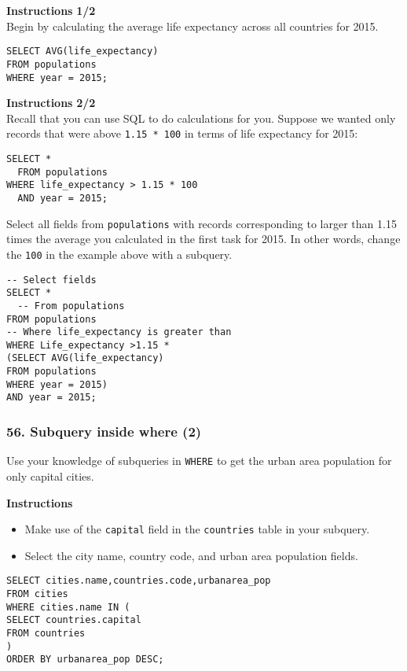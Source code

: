 \documentclass[
]{article}
\providecommand{\tightlist}{%
  \setlength{\itemsep}{0pt}\setlength{\parskip}{0pt}}
\begin{document}
\textbf{Instructions} \textbf{1/2}\\
Begin by calculating the average life expectancy across all countries
for 2015.

\begin{verbatim}
SELECT AVG(life_expectancy)
FROM populations
WHERE year = 2015;
\end{verbatim}

\textbf{Instructions} \textbf{2/2}\\
Recall that you can use SQL to do calculations for you. Suppose we
wanted only records that were above \texttt{1.15\ *\ 100} in terms of
life expectancy for 2015:

\begin{verbatim}
SELECT *
  FROM populations
WHERE life_expectancy > 1.15 * 100
  AND year = 2015;
\end{verbatim}

Select all fields from \texttt{populations} with records corresponding
to larger than 1.15 times the average you calculated in the first task
for 2015. In other words, change the \texttt{100} in the example above
with a subquery.

\begin{verbatim}
-- Select fields
SELECT *
  -- From populations
FROM populations
-- Where life_expectancy is greater than
WHERE Life_expectancy >1.15 * 
(SELECT AVG(life_expectancy)
FROM populations
WHERE year = 2015) 
AND year = 2015;
\end{verbatim}

\hypertarget{subquery-inside-where-2}{%
\subsubsection{56. Subquery inside where
(2)}\label{subquery-inside-where-2}}

Use your knowledge of subqueries in \texttt{WHERE} to get the urban area
population for only capital cities.

\textbf{Instructions}

\begin{itemize}
\tightlist
\item
  Make use of the \texttt{capital} field in the \texttt{countries} table
  in your subquery.\\
\item
  Select the city name, country code, and urban area population fields.
\end{itemize}

\begin{verbatim}
SELECT cities.name,countries.code,urbanarea_pop
FROM cities
WHERE cities.name IN (
SELECT countries.capital
FROM countries
)
ORDER BY urbanarea_pop DESC;
\end{verbatim}
\end{document}
